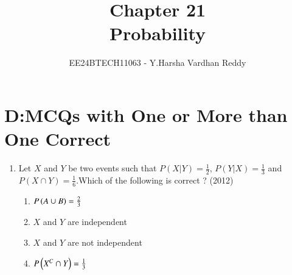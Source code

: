 \documentclass[journal,,12pt,twocolumn]{IEEEtran}
\theoremstyle{remark}
\begin{document}

\vspace{3cm}

\title{Chapter 21\\Probability}
\author{EE24BTECH11063 - Y.Harsha Vardhan Reddy}
\maketitle
\newpage
\bigskip

\renewcommand{\thefigure}{\theenumi}
\renewcommand{\thetable}{\theenumi}

\section*{D:MCQs with One or More than One Correct}
\begin{enumerate}
    \item Let $X$ and $Y$ be two events such that $P(X|Y)=\frac{1}{2}$, $P(Y|X)=\frac{1}{3}$ and $P(X\cap Y)=\frac{1}{6}$.Which of the following is  correct ?
    \hfill{(2012)}
    \begin{enumerate}
    
        
    
        \item $P\left(A\cup B\right)=\frac{2}{3}$
        \item $X$ and $Y$ are independent 
        \item $X$ and $Y$ are not independent
        \item $P\left(X^C \cap Y\right)=\frac{1}{3}$ 
        

\end{enumerate}
\end{enumerate}
\end{document}
